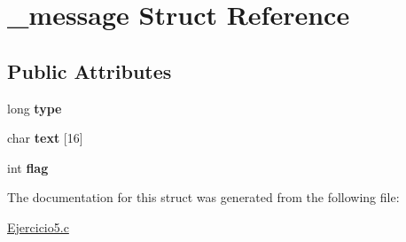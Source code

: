 \hypertarget{struct__message}{}\section{\+\_\+message Struct Reference}
\label{struct__message}
\subsection*{Public Attributes}
\begin{DoxyCompactItemize}
\item 
long {\bfseries type}\hypertarget{struct__message_a0ed689031575cf4ef7330f807cfd8c2f}{}\label{struct__message_a0ed689031575cf4ef7330f807cfd8c2f}

\item 
char {\bfseries text} \mbox{[}16\mbox{]}\hypertarget{struct__message_a390dbde354d571c3d1fbcffda32798d2}{}\label{struct__message_a390dbde354d571c3d1fbcffda32798d2}

\item 
int {\bfseries flag}\hypertarget{struct__message_a6ab433a62c87c70cf3af3900449df656}{}\label{struct__message_a6ab433a62c87c70cf3af3900449df656}

\end{DoxyCompactItemize}


The documentation for this struct was generated from the following file\+:\begin{DoxyCompactItemize}
\item 
\hyperlink{Ejercicio5_8c}{Ejercicio5.\+c}\end{DoxyCompactItemize}
